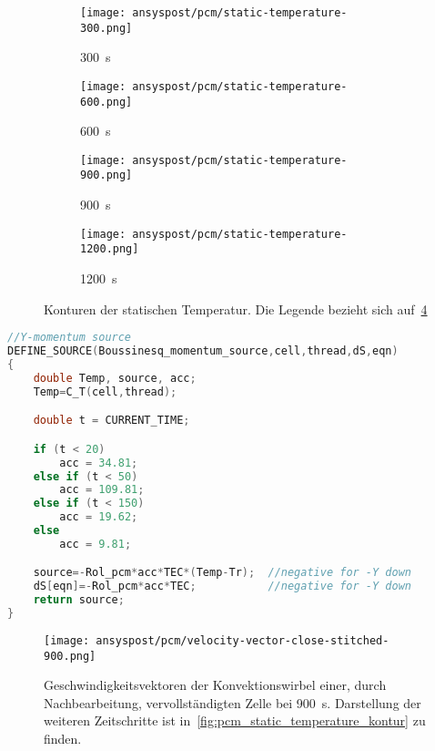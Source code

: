 \begin{figure}[H]
\begin{minipage}[t]{0.485\textwidth}
\begin{subfigure}[t]{0.16\textwidth}
        \end{subfigure}%
        \hspace{2mm}%
        \begin{subfigure}[t]{0.2\textwidth}
            \centering
            \texttt{[image: ansyspost/pcm/static-temperature-300.png]}
            \caption{\SI{300}{\second}}\label{fig:temperatur_300}
        \end{subfigure}%
        \begin{subfigure}[t]{0.2\textwidth}
            \centering
            \texttt{[image: ansyspost/pcm/static-temperature-600.png]}
            \caption{\SI{600}{\second}}\label{fig:temperatur_600}
        \end{subfigure}%
        \begin{subfigure}[t]{0.2\textwidth}
            \centering
            \texttt{[image: ansyspost/pcm/static-temperature-900.png]}
            \caption{\SI{900}{\second}}\label{fig:temperatur_900}
        \end{subfigure}%
        \begin{subfigure}[t]{0.2\textwidth}
            \centering
            \texttt{[image: ansyspost/pcm/static-temperature-1200.png]}
            \caption{\SI{1200}{\second}}\label{fig:temperatur_1200}
        \end{subfigure}
        \caption{Konturen der statischen Temperatur. Die Legende bezieht sich auf~\ref{fig:temperatur_1200}}
        \label{fig:static_temperature_kontur}
    \end{minipage}

\end{figure}


\begin{lstlisting}[language=C, float, caption={Boussinesq-Approximation des Auftriebs im \ac{pcm} in der \ac{udf} eicosane.c}, label={lst:udf_bossinesque}]
//Y-momentum source
DEFINE_SOURCE(Boussinesq_momentum_source,cell,thread,dS,eqn)
{
	double Temp, source, acc;
	Temp=C_T(cell,thread);

	double t = CURRENT_TIME;

	if (t < 20)
		acc = 34.81;
	else if (t < 50)
		acc = 109.81;
	else if (t < 150)
		acc = 19.62;
	else
		acc = 9.81;

	source=-Rol_pcm*acc*TEC*(Temp-Tr);  //negative for -Y down
	dS[eqn]=-Rol_pcm*acc*TEC; 			//negative for -Y down
	return source;
}
\end{lstlisting}

\begin{figure}[H]
  \centering
  \texttt{[image: ansyspost/pcm/velocity-vector-close-stitched-900.png]}
  \caption{Geschwindigkeitsvektoren der Konvektionswirbel einer, durch Nachbearbeitung, vervollständigten Zelle
  bei \SI{900}{\second}. Darstellung der weiteren Zeitschritte ist in~\ref{fig:pcm_static_temperature_kontur} zu finden.}\label{fig:pcm_vectoren_stitched}
\end{figure}